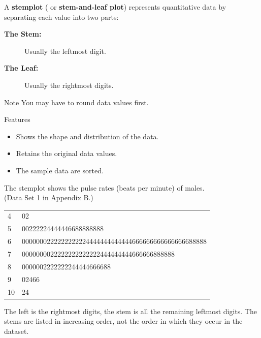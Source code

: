 \documentclass{beamer}
\begin{document}
\begin{frame}
\begin{definition}
A \textbf{stemplot} ( or \textbf{stem-and-leaf plot}) represents quantitative data by separating each value into two parts: %
\begin{description}
\item[\textbf{The Stem:}] Usually the leftmost digit.
\item[\textbf{The Leaf:}] Usually the rightmost digits.
\end{description}
\end{definition}\pause

\begin{block}{Note}
You may have to round data values first.
\end{block}\pause

\begin{block}{Features}
\begin{itemize}
\item Shows the shape and distribution of the data.
\item Retains the original data values.
\item The sample data are sorted.
\end{itemize}
\end{block}
\end{frame}

\begin{frame}
\begin{example}
The stemplot shows the pulse rates (beats per minute) of males.\\(Data Set 1 in Appendix B.)
\begin{center}
\begin{tabular}{l|l}
4 & 02 \\
5 & 00222224444446688888888 \\
6 & 0000000222222222224444444444444666666666666666688888 \\
7 & 0000000022222222222222444444444666666888888 \\
8 & 0000002222222244444666688 \\
9 & 02466 \\
10 & 24
\end{tabular}
\end{center}
The left is the rightmost digits, the stem is all the remaining leftmost digits. The stems are listed in increasing order, not the order in which they occur in the dataset.
\end{example}
\end{frame}
\end{document}
